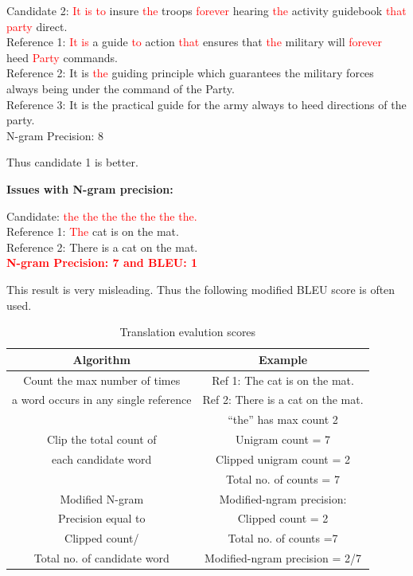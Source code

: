 \documentclass[a4paper]{article}
\newcommand{\red}[1]{\textcolor{red}{#1}}
\begin{document}
Candidate 2: \red{It is to} insure \red {the} troops \red {forever} hearing \red
{the} activity guidebook \red{that party} direct. \\
Reference 1: \red {It is} a guide \red {to} action \red {that} ensures that \red
{the} military will  \red{forever} heed \red{Party} commands. \\ Reference 2: It
is \red{the} guiding principle which guarantees the
military forces always being under the command of the Party. \\ Reference 3:  It
is the practical guide for the army always to heed directions of the party. \\
N-gram Precision: 8

Thus candidate 1 is better.

\textbf{Issues with N-gram precision:}

Candidate: \red{the the the the the the the.} \\
Reference 1: \red{The} cat is on the mat. \\
Reference 2: There is a cat on the mat. \\

\textbf{\red{N-gram Precision: 7 and BLEU: 1}}

This result is  very misleading. Thus the following modified BLEU score is often
used.


\begin{table}[h]
  \centering
  \begin{tabular}{|c|c|}
    \hline

    \textbf{Algorithm}  & \textbf{Example}  \\

    \hline

    Count the max number of times & Ref 1: The cat is on the mat.  \\
    a word occurs in any single reference & Ref 2: There is a cat on the mat. \\
    & “the” has max count 2 \\

    \hline

    Clip the total count of & Unigram count = 7 \\
    each candidate word & Clipped unigram count = 2 \\
    &Total no. of counts = 7 \\

    \hline

    Modified N-gram & Modified-ngram precision: \\
    Precision equal to & Clipped count = 2 \\
    Clipped count/ & Total no. of counts =7 \\
    Total no. of candidate word & Modified-ngram precision = 2/7\\

    \hline
  \end{tabular}
  \caption{Translation evalution scores}
\end{table}
\end{document}
